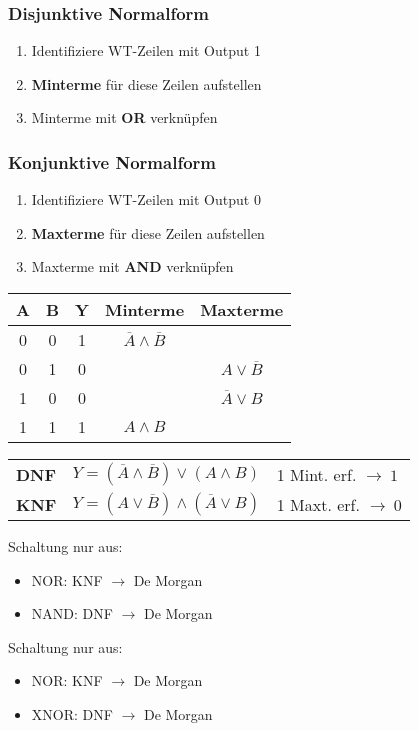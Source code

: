 \subsubsection{Disjunktive Normalform}
\begin{enumerate}
    \item Identifiziere WT-Zeilen mit Output 1
    \item \textbf{Minterme} für diese Zeilen aufstellen
    \item Minterme mit \textbf{OR} verknüpfen
\end{enumerate}
\subsubsection{Konjunktive Normalform}
\begin{enumerate}
    \item Identifiziere WT-Zeilen mit Output 0
    \item \textbf{Maxterme} für diese Zeilen aufstellen
    \item Maxterme mit \textbf{AND} verknüpfen
\end{enumerate}
\begin{center}
        \begin{tabular}{|c c|c|c|c|}
            \hline
            A & B & Y & Minterme & Maxterme\\
            \hline
            0 & 0 & 1 & $\overline{A} \land \overline{B}$ & \\
            0 & 1 & 0 & & $A \lor \overline{B}$\\
            1 & 0 & 0 & & $\overline{A} \lor B$\\
            1 & 1 & 1 & $A \land B$ & \\
            \hline
        \end{tabular}
\end{center}

\begin{flushleft}
    \renewcommand{\arraystretch}{1.5}
    \begin{tabular}{l l l}
        \textbf{DNF} & $Y = (\overline{A} \land \overline{B}) \lor (A \land B)$ & {\small 1 Mint. erf. $\rightarrow~1$}\\
        \textbf{KNF} & $Y = (A \lor \overline{B}) \land (\overline{A} \lor B)$ & {\small 1 Maxt. erf. $\rightarrow~0$}\\
    \end{tabular}
\end{flushleft}
Schaltung nur aus:
\begin{itemize}
    \item NOR: KNF $\rightarrow$ De Morgan
    \item NAND: DNF $\rightarrow$ De Morgan
\end{itemize}
Schaltung nur aus:
\begin{itemize}
    \item NOR: KNF $\rightarrow$ De Morgan
    \item XNOR: DNF $\rightarrow$ De Morgan
\end{itemize}